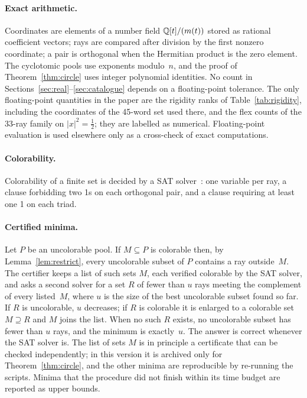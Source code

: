 \paragraph{Exact arithmetic.}  Coordinates are elements of a number field $\mathbb{Q}[t]/(m(t))$ stored
as rational coefficient vectors; rays are compared after division by the first nonzero
coordinate; a pair is orthogonal when the Hermitian product is the zero element.  The
cyclotomic pools use exponents modulo~$n$, and the proof of Theorem~\ref{thm:circle} uses
integer polynomial identities.  No count in Sections~\ref{sec:real}--\ref{sec:catalogue} depends
on a floating-point tolerance.  The only floating-point quantities in the paper are the rigidity ranks of
Table~\ref{tab:rigidity}, including the coordinates of the 45-word set used there, and the flex
counts of the 33-ray family on $|x|^2=\tfrac12$; they are labelled as numerical.  Floating-point
evaluation is used elsewhere only as a cross-check of exact computations.

\paragraph{Colorability.}  Colorability of a finite set is decided by a SAT
solver~\cite{AudemardSimon2018}: one variable per ray, a clause forbidding two 1s on each
orthogonal pair, and a clause requiring at least one 1 on each triad.

\paragraph{Certified minima.}  Let $P$ be an uncolorable pool.  If $M\subseteq P$ is colorable
then, by Lemma~\ref{lem:restrict}, every uncolorable subset of $P$ contains a ray outside~$M$.
The certifier keeps a list of such sets $M$, each verified colorable by the SAT solver, and asks
a second solver for a set $R$ of fewer than $u$ rays meeting the complement of every listed~$M$,
where $u$ is the size of the best uncolorable subset found so far.  If $R$ is uncolorable, $u$
decreases; if $R$ is colorable it is enlarged to a colorable set $M\supseteq R$ and $M$ joins the
list.  When no such $R$ exists, no uncolorable subset has fewer than $u$ rays, and the minimum is
exactly~$u$.  The answer is correct whenever the SAT solver is.  The list of sets $M$ is in principle a
certificate that can be checked independently; in this version it is archived only for
Theorem~\ref{thm:circle}, and the other minima are reproducible by re-running the scripts.  Minima that the procedure did not finish within
its time budget are reported as upper bounds.

